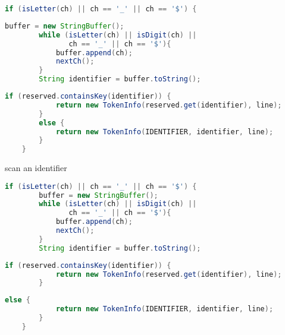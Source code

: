 \documentclass[8pt,a4paper,compress]{beamer}
\begin{document}
\begin{frame}[fragile]
\begin{overprint}
\begin{tcolorbox}[enhanced,drop shadow southwest,sharp corners,size=fbox,colback=white,fontlower=\small\ttfamily,collower=silver900]
\begin{lstlisting}[language=Java,style=focusout]
    if (isLetter(ch) || ch == '_' || ch == '$') {
\end{lstlisting}
\begin{lstlisting}[language=Java,style=focusin,backgroundcolor=\color{lime100}]
        buffer = new StringBuffer();
        while (isLetter(ch) || isDigit(ch) || 
               ch == '_' || ch == '$'){
            buffer.append(ch);
            nextCh();
        }
        String identifier = buffer.toString();                 
\end{lstlisting}
\begin{lstlisting}[language=Java,style=focusout]
        if (reserved.containsKey(identifier)) {
            return new TokenInfo(reserved.get(identifier), line); 
        }
        else {                     
            return new TokenInfo(IDENTIFIER, identifier, line);                 
        }
    }
\end{lstlisting}

\tcblower
\begin{minipage}[t][.25cm][t]{\textwidth}
scan an identifier
\end{minipage}
\end{tcolorbox}

\begin{tcolorbox}[enhanced,drop shadow southwest,sharp corners,size=fbox,colback=white,fontlower=\small\ttfamily,collower=silver900]

\begin{lstlisting}[language=Java,style=focusout]
    if (isLetter(ch) || ch == '_' || ch == '$') {
        buffer = new StringBuffer();
        while (isLetter(ch) || isDigit(ch) || 
               ch == '_' || ch == '$'){
            buffer.append(ch);
            nextCh();
        }
        String identifier = buffer.toString();                 
\end{lstlisting}
\begin{lstlisting}[language=Java,style=focusin,backgroundcolor=\color{lime100}]
        if (reserved.containsKey(identifier)) {
            return new TokenInfo(reserved.get(identifier), line); 
        }
\end{lstlisting}
\begin{lstlisting}[language=Java,style=focusout]
        else {                     
            return new TokenInfo(IDENTIFIER, identifier, line);                 
        }
    }
\end{lstlisting}


\end{tcolorbox}
\end{overprint}
\end{frame}
\end{document}
